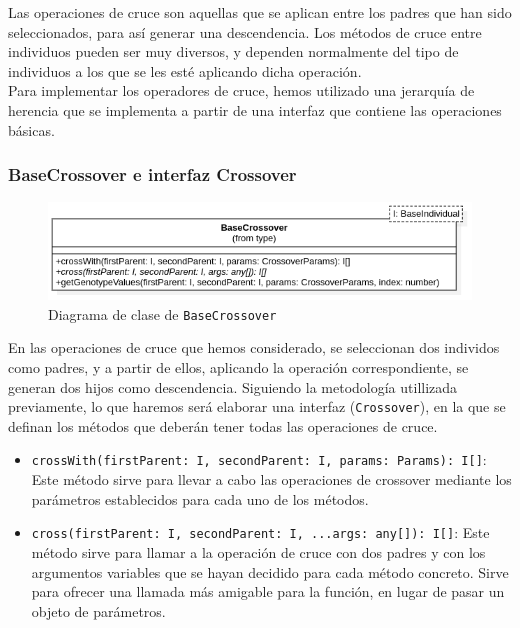 Las operaciones de cruce son aquellas que se aplican entre los padres que han sido seleccionados, para así generar una descendencia. Los métodos de cruce entre individuos pueden ser muy diversos, y dependen normalmente del tipo de individuos a los que se les esté aplicando dicha operación.\\

Para implementar los operadores de cruce, hemos utilizado una jerarquía de herencia que se implementa a partir de una interfaz que contiene las operaciones básicas.


\subsubsection{BaseCrossover e interfaz Crossover}

\begin{figure}[H]
    \centering
    \includegraphics[scale=0.5]{mem/images/cap-4/4.2.6(Crossover)/BaseCrossover.png}
    \caption{Diagrama de clase de \texttt{BaseCrossover}}
    \label{fig:my_label}
\end{figure}

En las operaciones de cruce que hemos considerado, se seleccionan dos individos como padres, y a partir de ellos, aplicando la operación correspondiente, se generan dos hijos como descendencia. Siguiendo la metodología utillizada previamente, lo que haremos será elaborar una interfaz (\texttt{Crossover}), en la que se definan los métodos que deberán tener todas las operaciones de cruce.

\begin{itemize}
    \item \texttt{crossWith(firstParent: I, secondParent: I, params: Params): I[]}: Este método sirve para llevar a cabo las operaciones de crossover mediante los parámetros establecidos para cada uno de los métodos.
    \item \texttt{cross(firstParent: I, secondParent: I, ...args: any[]): I[]}: Este método sirve para llamar a la operación de cruce con dos padres y con los argumentos variables que se hayan decidido para cada método concreto. Sirve para ofrecer una llamada más amigable para la función, en lugar de pasar un objeto de parámetros.
\end{itemize}

